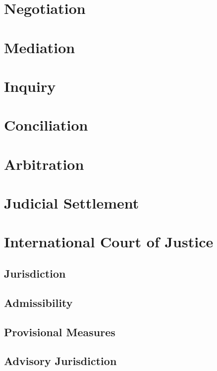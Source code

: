 \section{Negotiation}

\section{Mediation}

\section{Inquiry}

\section{Conciliation}

\section{Arbitration}

\section{Judicial Settlement}

\section{International Court of Justice}

\subsection{Jurisdiction}

\subsection{Admissibility}

\subsection{Provisional Measures}

\subsection{Advisory Jurisdiction}
